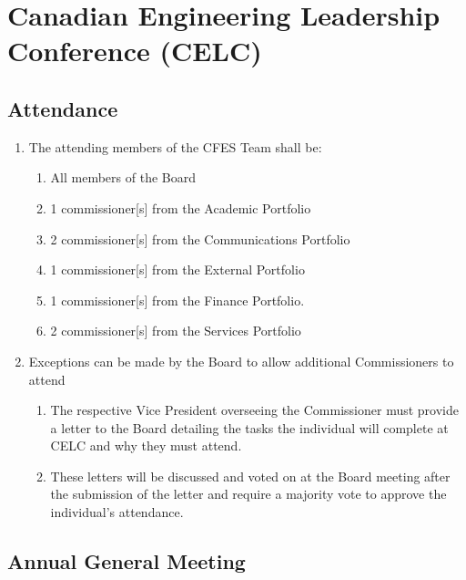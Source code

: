 \section{Canadian Engineering Leadership Conference (CELC)}
\label{canadian-engineering-leadership-conference-celc}

\subsection{Attendance}
\label{attendance-2}

\begin{enumerate}
 \item
  The attending members of the CFES Team shall be:

  \begin{enumerate}
   \item
    All members of the Board
   \item
    1 commissioner{[}s{]} from the Academic Portfolio
   \item
    2 commissioner{[}s{]} from the Communications Portfolio
   \item
    1 commissioner{[}s{]} from the External Portfolio
   \item
    1 commissioner{[}s{]} from the Finance Portfolio.
   \item
    2 commissioner{[}s{]} from the Services Portfolio
  \end{enumerate}

 \item
  Exceptions can be made by the Board to allow additional Commissioners to attend

  \begin{enumerate}
   \item
    The respective Vice President overseeing the Commissioner must provide a letter to the Board detailing the tasks the individual will complete at CELC and why they must attend.
   \item
    These letters will be discussed and voted on at the Board meeting after the submission of the letter and require a majority vote to approve the individual's attendance.
  \end{enumerate}
\end{enumerate}

\subsection{Annual General Meeting}
\label{annual-general-meeting}

